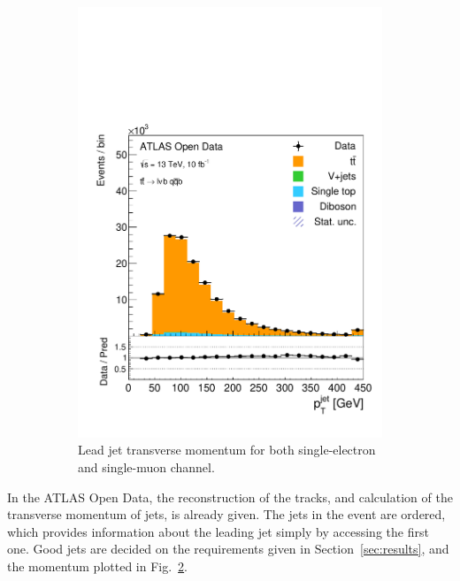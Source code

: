 \documentclass[12pt,a4paper]{article}
\numberwithin{equation}{section}
\begin{document}
\begin{figure}[t!]
\begin{subfigure}[t]{0.47\textwidth}
      \includegraphics[width=1.0\textwidth]{figures/hist_leadjet_pt}
      \caption{\label{fig:jetpt}Lead jet transverse momentum for both
        single-electron and single-muon channel.}
    \end{subfigure}
    \caption{}
\end{figure}

In the ATLAS Open Data, the reconstruction of the tracks, and calculation of the
transverse momentum of jets, is already given. The jets in the event are
ordered, which provides information about the leading jet simply by accessing
the first one. Good jets are decided on the requirements given in
Section~\ref{sec:results}, and the momentum plotted in
Fig.~\ref{fig:jetpt}. \\%
\end{document}
